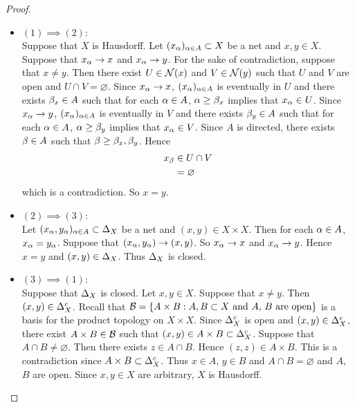 \documentclass{book}
\begin{document}
	\begin{proof}\
		\begin{itemize}
			\item $(1) \implies (2)$: \\
			Suppose that $X$ is Hausdorff. Let $(x_{\alpha})_{\alpha \in A} \subset X$ be a net and $x,y \in X$. Suppose that $x_{\alpha} \rightarrow x$ and $x_{\alpha} \rightarrow y$. For the sake of contradiction, suppose that $x \neq y$. Then there exist $U \in \mathcal{N}(x)$ and $V \in \mathcal{N}(y)$ such that $U$ and $V$ are open and $U \cap V = \varnothing$. Since $x_{\alpha} \rightarrow x$, $(x_{\alpha})_{\alpha \in A}$ is eventually in $U$ and there exists $\beta_x \in A$ such that for each $\alpha \in A$, $\alpha \geq \beta_x$ implies that $x_{\alpha} \in U$. Since $x_{\alpha} \rightarrow y$, $(x_{\alpha})_{\alpha \in A}$ is eventually in $V$ and there exists $\beta_y \in A$ such that for each $\alpha \in A$, $\alpha \geq \beta_y$ implies that $x_{\alpha} \in V$. Since $A$ is directed, there exists $\beta \in A$ such that $\beta \geq \beta_x, \beta_y$. Hence 
			\begin{align*}
				x_{\beta} 
				& \in U \cap V \\
				& = \varnothing
			\end{align*}
			which is a contradiction. So $x = y$.
			\item $(2) \implies (3)$: \\
			Let $(x_{\alpha}, y_{\alpha})_{\alpha \in A} \subset \Delta_X$ be a net and $(x,y) \in X \times X$. Then for each $\alpha \in A$, $x_{\alpha} = y_{\alpha}$. Suppose that $(x_{\alpha}, y_{\alpha}) \rightarrow (x,y)$. So $x_{\alpha} \rightarrow x$ and $x_{\alpha} \rightarrow y$. Hence $x = y$ and $(x,y) \in \Delta_X$. Thus $\Delta_X$ is closed.
			\item $(3) \implies (1)$: \\
			Suppose that $\Delta_X$ is closed. Let $x,y \in X$. Suppose that $x \neq y$. Then $(x,y) \in \Delta_X^c$. Recall that $\mathcal{B} = \{A \times B: A,B \subset X \text{ and $A$, $B$ are open}\}$ is a basis for the product topology on $X \times X$. Since $\Delta_X^c$ is open and $(x,y) \in \Delta_X^c$, there exist $A \times B \in \mathcal{B}$ such that $(x,y) \in A \times B \subset \Delta_X^c$. Suppose that $A \cap B \neq \varnothing$. Then there exists $z \in A \cap B$. Hence $(z,z) \in A \times B$. This is a contradiction since $A  \times B \subset \Delta_X^c$. Thus $x \in A$, $y \in B$ and $A \cap B = \varnothing$ and $A$, $B$ are open. Since $x,y \in X$ are arbitrary, $X$ is Hausdorff. 
		\end{itemize}
	\end{proof}
	
\end{document}
